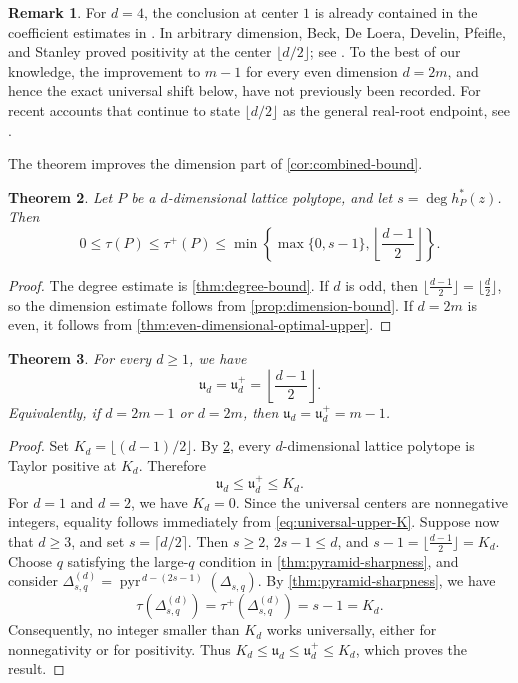 \documentclass[reqno, 12pt]{article}
\numberwithin{equation}{section}
\newtheorem{theorem}{Theorem}[section]
\theoremstyle{definition}
\newtheorem{remark}[theorem]{Remark}
\begin{document}
\begin{remark}
For $d=4$, the conclusion at center $1$ is already contained in the
coefficient estimates in \cite[Proposition~4.7]{BeckEtAl2005}.  In arbitrary dimension, Beck,
De Loera, Develin, Pfeifle, and Stanley proved positivity at the center $\lfloor d/2\rfloor$; see
\cite[Theorem~1.2(b) and its proof]{BeckEtAl2005}.  To the best of our knowledge, the improvement to $m-1$ for every even dimension $d=2m$, and hence the exact universal shift below, have not previously been recorded.  For recent accounts that continue to state
$\lfloor d/2\rfloor$ as the general real-root endpoint, see \cite{FerroniHigashitani2024,Koelbl2025}.
\end{remark}

The theorem improves the dimension part of \cref{cor:combined-bound}.

\begin{theorem}\label{cor:improved-combined-bound}
Let $P$ be a $d$-dimensional lattice polytope, and let
$s=\deg h_P^*(z)$.  Then
\[ 0\leq\tau(P)\leq\tau^+(P)\leq\min\left\{\max\{0,s-1\},\left\lfloor\frac{d-1}{2}\right\rfloor\right\}.
\]
\end{theorem}
\begin{proof}
The degree estimate is \cref{thm:degree-bound}.  If $d$ is odd, then $\lfloor\frac{d-1}{2}\rfloor=\lfloor\frac d2\rfloor$,
so the dimension estimate follows from \cref{prop:dimension-bound}.  If $d=2m$ is even, it follows from \cref{thm:even-dimensional-optimal-upper}.
\end{proof}

\begin{theorem}\label{thm:all-dimensional-optimal-shift}
For every $d\geq1$, we have 
\[\mathfrak u_d=\mathfrak u_d^+=\left\lfloor\frac{d-1}{2}\right\rfloor.
\]
Equivalently, if $d=2m-1$ or $d=2m$, then $\mathfrak u_d=\mathfrak u_d^+=m-1$.
\end{theorem}
\begin{proof}
Set $K_d=\lfloor(d-1)/2\rfloor$.  By \cref{cor:improved-combined-bound}, every $d$-dimensional lattice
polytope is Taylor positive at $K_d$.  Therefore
\begin{equation}\label{eq:universal-upper-K}
 \mathfrak u_d\leq\mathfrak u_d^+\leq K_d.
\end{equation}
For $d=1$ and $d=2$, we have $K_d=0$.  Since the universal centers are nonnegative integers, equality follows immediately from
\eqref{eq:universal-upper-K}.
Suppose now that $d\geq3$, and set $s=\lceil d/2\rceil$.  Then $s\geq2$, $2s-1\leq d$, and
$s-1=\lfloor\frac{d-1}{2}\rfloor=K_d$.
Choose $q$ satisfying the large-$q$ condition in \cref{thm:pyramid-sharpness}, and consider
$\Delta_{s,q}^{(d)}=\operatorname{pyr}^{\,d-(2s-1)}(\Delta_{s,q})$.
By \cref{thm:pyramid-sharpness}, we have 
\[\tau(\Delta_{s,q}^{(d)})=\tau^+(\Delta_{s,q}^{(d)})=s-1=K_d.\]
Consequently, no integer smaller than $K_d$ works universally, either for nonnegativity or for positivity.  Thus
$K_d\leq\mathfrak u_d\leq\mathfrak u_d^+\leq K_d$, which proves the result.
\end{proof}
\end{document}
